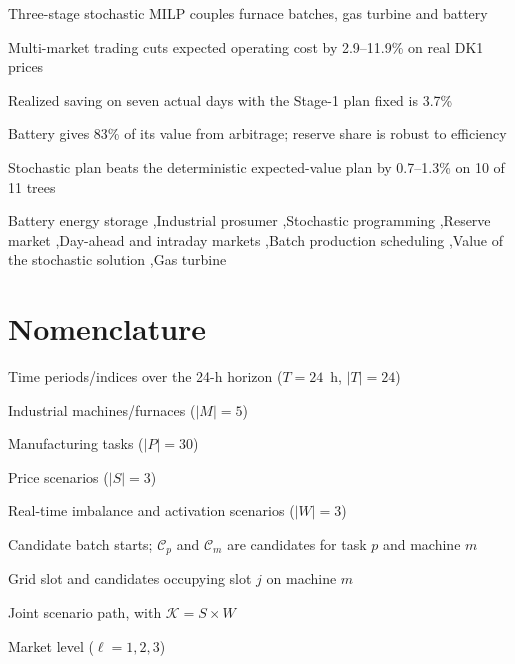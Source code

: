 \documentclass[5p,times,twocolumn]{elsarticle}
\newenvironment{nomlist}{%
  \begingroup\footnotesize
  \list{}{%
    \setlength{\labelwidth}{0.27\columnwidth}%
    \setlength{\labelsep}{4pt}%
    \setlength{\leftmargin}{\dimexpr\labelwidth+\labelsep\relax}%
    \setlength{\itemsep}{0.5pt}\setlength{\parsep}{0pt}%
    \setlength{\topsep}{1pt}\setlength{\partopsep}{0pt}%
    \renewcommand{\makelabel}[1]{##1\hfil}}%
}{\endlist\endgroup}
\newcommand{\nomheading}[1]{%
  \Needspace{4\baselineskip}%
  \par\vspace{3pt}\noindent{\footnotesize\bfseries\itshape #1}\par\vspace{1pt}}
\newcommand{\nomitem}[2]{\item[#1] #2}
\begin{document}
\begin{frontmatter}
\begin{highlights}
\item Three-stage stochastic MILP couples furnace batches, gas turbine and battery
\item Multi-market trading cuts expected operating cost by 2.9--11.9\% on real DK1 prices
\item Realized saving on seven actual days with the Stage-1 plan fixed is 3.7\%
\item Battery gives 83\% of its value from arbitrage; reserve share is robust to efficiency
\item Stochastic plan beats the deterministic expected-value plan by 0.7--1.3\% on 10 of 11 trees
\end{highlights}

\begin{keyword}
Battery energy storage \sep Industrial prosumer \sep Stochastic programming \sep Reserve market \sep Day-ahead and intraday markets \sep Batch production scheduling \sep Value of the stochastic solution \sep Gas turbine
\end{keyword}

\end{frontmatter}


\section*{Nomenclature}

\nomheading{Sets and indices}
\begin{nomlist}
\nomitem{$t,\tau\in T$}{Time periods/indices over the 24-h horizon ($T=24$~h, $|T|=24$)}
\nomitem{$m\in M$}{Industrial machines/furnaces ($|M|=5$)}
\nomitem{$p\in P$}{Manufacturing tasks ($|P|=30$)}
\nomitem{$s,\tilde{s}\in S$}{Price scenarios ($|S|=3$)}
\nomitem{$w\in W$}{Real-time imbalance and activation scenarios ($|W|=3$)}
\nomitem{$c\in\mathcal{C}$}{Candidate batch starts; $\mathcal{C}_p$ and $\mathcal{C}_m$ are candidates for task $p$ and machine $m$}
\nomitem{$j,\mathcal{U}_{m,j}$}{Grid slot and candidates occupying slot $j$ on machine $m$}
\nomitem{$k\in\mathcal{K}$}{Joint scenario path, with $\mathcal{K}=S\times W$}
\nomitem{$\ell$}{Market level ($\ell=1,2,3$)}
\end{nomlist}
\end{document}
